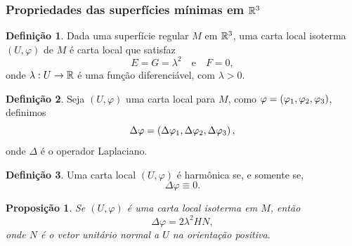 \documentclass[12pt,a4paper]{beamer}
\newtheorem{proposicao}{Proposição}
\theoremstyle{definition}
\newtheorem{definicao}{Definição}
\begin{document}
\begin{frame}
	\frametitle{Propriedades das superfícies mínimas em $\mathbb R^3$}
	
	\begin{definicao}
		Dada uma superfície regular $M$ em $\mathbb R^3$, uma \alert{carta local isoterma} $(U, \varphi)$ de $M$ é carta local que satisfaz
		\begin{equation*}
		E = G = \lambda^2 \quad \text{e} \quad F=0,
		\end{equation*}
		onde $\lambda: U \rightarrow \mathbb R$ é uma função diferenciável, com $\lambda > 0$.
	\end{definicao}

	\pause
	
	\begin{definicao}
		Seja $(U, \varphi)$ uma carta local para $M$, como $\varphi = \left( \varphi_1, \varphi_2, \varphi_3 \right)$, definimos
		\begin{equation*}
		\Delta \varphi = \left( \Delta \varphi_1, \Delta \varphi_2, \Delta \varphi_3 \right),
		\end{equation*}
		onde $\Delta$ é o operador Laplaciano.
	\end{definicao}

\end{frame}

\begin{frame}

	\begin{definicao}
		Uma carta local $(U,\varphi)$ é \alert{harmônica} se, e somente se,
		\begin{equation*}
		\Delta \varphi \equiv 0.
		\end{equation*}
	\end{definicao}

	\pause
	
	\begin{proposicao}
		Se $(U, \varphi)$ é uma carta local isoterma em $M$, então 
		\begin{equation*}
		\Delta \varphi = 2 \lambda^2 H N,
		\end{equation*}
		onde $N$ é o vetor unitário normal a $U$ na orientação positiva.
	\end{proposicao}
	
\end{frame}
\end{document}
